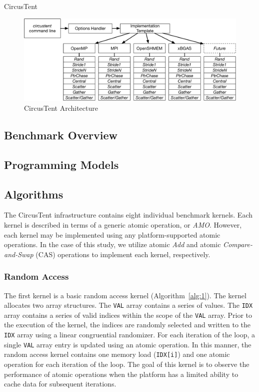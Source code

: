 
CircusTent

\begin{figure}[!t]
\centering
\includegraphics[width=5in]{figures/arch.pdf}
\caption{CircusTent Architecture}
\label{fig:ct_arch}
\end{figure}

\subsection{Benchmark Overview}
\label{subsec:benchmark_overview}

\subsection{Programming Models}
\label{subsec:programming_models}

\subsection{Algorithms}
\label{subsec:algorithms}

The CircusTent infrastructure contains eight individual benchmark kernels.
Each kernel is described in terms of a generic atomic operation, or \textit{AMO}.  
However, each kernel may be implemented using any platform-supported atomic operations.
In the case of this study, we utilize atomic \textit{Add} and atomic \textit{Compare-and-Swap} (CAS) operations to implement each kernel, respectively.  

\subsubsection{Random Access}
\label{subsubsec:random_access}

The first kernel is a basic random access kernel (Algorithm~\ref{alg:1}).
The kernel allocates two array structures.
The \texttt{VAL} array contains a series of values.
The \texttt{IDX} array contains a series of valid indices within the scope of the \texttt{VAL} array.
Prior to the execution of the kernel, the indices are randomly selected and written to the \texttt{IDX} array using a linear congruential randomizer.
For each iteration of the loop, a single \texttt{VAL} array entry is updated using an atomic operation.
In this manner, the random access kernel contains one memory load (\texttt{IDX[i]}) and one atomic operation for each iteration of the loop.
The goal of this kernel is to observe the performance of atomic operations when the platform has a limited ability to cache data for subsequent iterations.  

